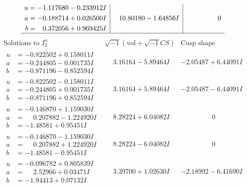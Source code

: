 \documentclass[1p]{elsarticle_modified}
\theoremstyle{definition}
\newcommand{\I}{\sqrt{-1}}
\begin{document}
$$\begin{array}{c|c|c}
\begin{aligned}
u &= -1.117680 - 0.233912 I \\
a &= -0.188714 + 0.026500 I \\
b &= \phantom{-}0.372056 + 0.969425 I\end{aligned}
 & \phantom{-}10.80180 - 1.64856 I & \phantom{-0.000000 } 0\\
 \hline 
 \end{array}$$\newpage$$\begin{array}{c|c|c}  
\text{Solutions to }I^u_{2}& \I (\text{vol} + \sqrt{-1}CS) & \text{Cusp shape}\\
 \hline 
\begin{aligned}
u &= -0.822502 + 0.158011 I \\
a &= -0.244805 - 0.001735 I \\
b &= -0.871196 - 0.852594 I\end{aligned}
 & \phantom{-}3.16164 - 5.89464 I & -2.05487 + 6.44091 I \\ \hline\begin{aligned}
u &= -0.822502 - 0.158011 I \\
a &= -0.244805 + 0.001735 I \\
b &= -0.871196 + 0.852594 I\end{aligned}
 & \phantom{-}3.16164 + 5.89464 I & -2.05487 - 6.44091 I \\ \hline\begin{aligned}
u &= -0.146870 + 1.159030 I \\
a &= \phantom{-}0.207882 - 1.224920 I \\
b &= -1.48581 + 0.95451 I\end{aligned}
 & \phantom{-}8.28224 + 6.04082 I & \phantom{-0.000000 } 0 \\ \hline\begin{aligned}
u &= -0.146870 - 1.159030 I \\
a &= \phantom{-}0.207882 + 1.224920 I \\
b &= -1.48581 - 0.95451 I\end{aligned}
 & \phantom{-}8.28224 - 6.04082 I & \phantom{-0.000000 } 0 \\ \hline\begin{aligned}
u &= -0.096782 + 0.805839 I \\
a &= \phantom{-}2.52966 + 0.03471 I \\
b &= -1.94413 + 0.07132 I\end{aligned}
 & \phantom{-}3.39700 + 1.02630 I & -2.18992 - 6.41690 I \\ \hline\begin{aligned}

\end{aligned}
\end{array}$$
\end{document}
